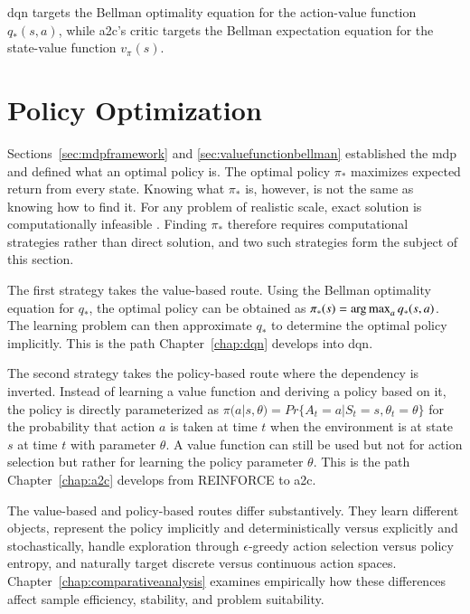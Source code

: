 \acrshort{dqn} targets the Bellman optimality equation for the action-value function $q_*(s,a)$, while \acrshort{a2c}'s critic targets the Bellman expectation equation for the state-value function $v_\pi\left(s\right)$.

\section{Policy Optimization}
\label{sec:policyoptimization}
Sections~\ref{sec:mdpframework} and \ref{sec:valuefunctionbellman} established the \acrshort{mdp} and defined what an optimal policy is. The optimal policy $\pi_*$ maximizes expected return from every state. Knowing what $\pi_*$ is, however, is not the same as knowing how to find it. For any problem of realistic scale, exact solution is computationally infeasible \citep[pp.~67, 69]{suttonReinforcementLearningIntroduction2020}. Finding $\pi_*$ therefore requires computational strategies rather than direct solution, and two such strategies form the subject of this section.

The first strategy takes the value-based route. Using the Bellman optimality equation for $q_*$, the optimal policy can be obtained as $\pi_*(s) = \operatorname*{arg\,max}_{a} q_*(s,a)$. The learning problem can then approximate $q_*$ to determine the optimal policy implicitly. This is the path Chapter~\ref{chap:dqn} develops into \acrshort{dqn}.

The second strategy takes the policy-based route where the dependency is inverted. Instead of learning a value function and deriving a policy based on it, the policy is directly parameterized as $\pi(a|s, \theta) = Pr\{A_t=a|S_t=s, \theta_t=\theta\}$ for the probability that action $a$ is taken at time $t$ when the environment is at state $s$ at time $t$ with parameter $\theta$. A value function can still be used but not for action selection but rather for learning the policy parameter $\theta$. This is the path Chapter~\ref{chap:a2c} develops from REINFORCE to \acrshort{a2c}.

The value-based and policy-based routes differ substantively. They learn different objects, represent the policy implicitly and deterministically versus explicitly and stochastically, handle exploration through $\epsilon$-greedy action selection versus policy entropy, and naturally target discrete versus continuous action spaces. Chapter~\ref{chap:comparativeanalysis} examines empirically how these differences affect sample efficiency, stability, and problem suitability.